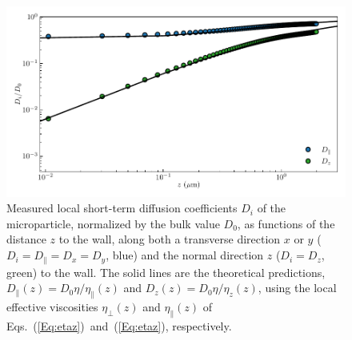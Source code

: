 \begin{figure}[H]
	\centering
	\includegraphics{02_body/chapter3/images/trajctory_analysis/visco.pdf}
	\caption{ Measured local short-term diffusion coefficients $D_i$ of the microparticle, normalized by the bulk value $D_0$, as functions of the distance $z$ to the wall, along both a transverse direction $x$ or $y$ ($D_i=D_\parallel=D_x=D_y$, blue) and the normal direction $z$ ($D_i=D_z$, green) to the wall. The solid lines are the theoretical predictions, $D_{\parallel}(z)=D_0\eta/\eta_{\parallel}(z)$ and $D_z(z)=D_0\eta/\eta_z(z)$, using the local effective viscosities $\eta_{\bot}(z)$ and $\eta_\parallel(z)$ of Eqs.~(\ref{Eq:etaz})~and~(\ref{Eq:etaz}), respectively.~\href{https://github.com/eXpensia/Confined-Brownian-Motion/blob/main/02_body/chapter3/images/trajctory_analysis/graph_ploting.ipynb}{\faGithub}}
	\label{fig.visco}
\end{figure}


